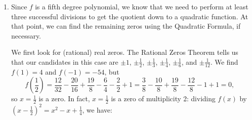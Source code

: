 {
\begin{enumerate}

\item  Since $f$ is a fifth degree polynomial, we know that we need to perform at least three successful divisions to get the quotient down to a quadratic function.  At that point, we can find the remaining zeros using the Quadratic Formula, if necessary.  
{
We first look for (rational) real zeros. The Rational Zeros Theorem tells us that our candidates in this case are $\pm 1$, $\pm \frac{1}{2}$, $\pm \frac{1}{3}$, $\pm \frac{1}{4}$, $\pm \frac{1}{6}$, and $\pm \frac{1}{12}$. We find $f(1)=4$ and $f(-1)=-54$, but 
\[
f\left(\frac{1}{2}\right) = \frac{12}{32}-\frac{20}{16}+\frac{19}{8}-\frac{6}{4}-\frac{2}{2}+1 = \frac{3}{8}-\frac{10}{8}+\frac{19}{8}-\frac{12}{8}-1+1 = 0,
\]
so $x=\frac{1}{2}$ is a zero. In fact, $x=\frac{1}{2}$ is a zero of multiplicity 2: dividing $f(x)$ by $\left(x-\frac{1}{2}\right)^2 = x^2-x+\frac{1}{4}$, we have:

}
\end{enumerate}}
